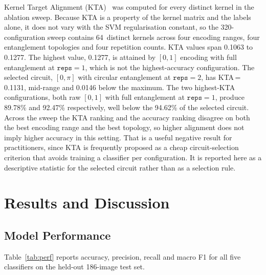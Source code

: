 \documentclass[10pt,conference]{IEEEtran}
\begin{document}
Kernel Target Alignment (KTA)~\cite{kta2001} was computed for every
distinct kernel in the ablation sweep. Because KTA is a property of the
kernel matrix and the labels alone, it does not vary with the SVM
regularisation constant, so the 320-configuration sweep contains
64~distinct kernels across four encoding ranges, four entanglement
topologies and four repetition counts. KTA values span 0.1063 to
0.1277. The highest value, 0.1277, is attained by $[0,1]$ encoding with
full entanglement at $\texttt{reps}\!=\!1$, which is not the
highest-accuracy configuration. The selected circuit, $[0,\pi]$ with
circular entanglement at $\texttt{reps}\!=\!2$, has KTA\,=\,0.1131,
mid-range and 0.0146 below the maximum. The two highest-KTA
configurations, both raw $[0,1]$ with full entanglement at
$\texttt{reps}\!=\!1$, produce 89.78\% and 92.47\% respectively, well
below the 94.62\% of the selected circuit. Across the sweep the KTA
ranking and the accuracy ranking disagree on both the best encoding
range and the best topology, so higher alignment does not imply higher
accuracy in this setting. That is a useful negative result for
practitioners, since KTA is frequently proposed as a cheap
circuit-selection criterion that avoids training a classifier per
configuration. It is reported here as a descriptive statistic for the
selected circuit rather than as a selection rule.

\section{Results and Discussion}

\subsection{Model Performance}

Table~\ref{tab:perf} reports accuracy, precision, recall and macro F1
for all five classifiers on the held-out 186-image test set.

\begin{table}[t]
\caption{Model Performance on the 186-Image Test Set}
\label{tab:perf}
\centering
\renewcommand{\arraystretch}{1.1}
\end{table}
\end{document}
